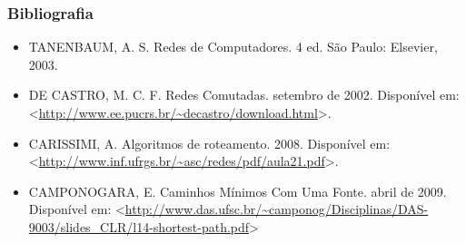 \documentclass{beamer}
\begin{document}
\begin{frame}
\frametitle{Bibliografia}
\begin{itemize}
  \item TANENBAUM, A. S. Redes de Computadores. 4 ed. São Paulo: Elsevier, 2003.
  \item DE CASTRO, M. C. F. Redes Comutadas. setembro de 2002. Disponível em:
  <\url{http://www.ee.pucrs.br/~decastro/download.html}>.
  \item CARISSIMI, A. Algoritmos de roteamento. 2008. Disponível em:
  <\url{http://www.inf.ufrgs.br/~asc/redes/pdf/aula21.pdf}>.
  \item CAMPONOGARA, E. Caminhos Mínimos Com Uma Fonte. abril de 2009.
  Disponível em:
  <\url{http://www.das.ufsc.br/~camponog/Disciplinas/DAS-9003/slides_CLR/l14-shortest-path.pdf}>
\end{itemize}
\end{frame}
\end{document}
